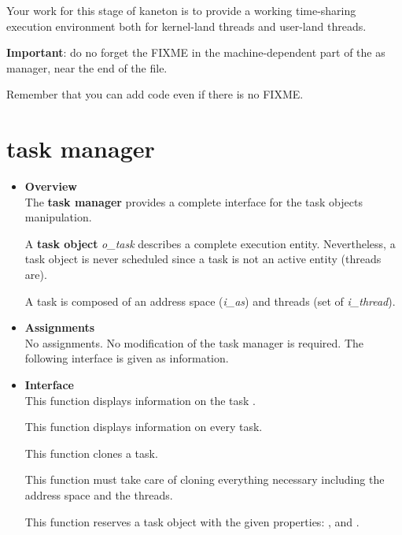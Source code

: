 Your work for this stage of kaneton is to provide a working
time-sharing execution environment both for kernel-land threads and
user-land threads.

\textbf{Important}: do no forget the FIXME in the machine-dependent
part of the as manager, near the end of the file.

Remember that you can add code even if there is no FIXME.


%
%

\newpage

\section{\textbf{task} manager}

\begin{itemize}
  \item {\bf Overview}\\

    The \textbf{task manager} provides a complete interface for the
    task objects manipulation.

    A \textbf{task object} \textit{o\_task} describes a complete
    execution entity. Nevertheless, a task object is never scheduled
    since a task is not an active entity (threads are).

    A task is composed of an address space (\textit{i\_as}) and threads
    (set of \textit{i\_thread}).

  \item {\bf Assignments}\\

    No assignments. No modification of the task manager is
    required. The following interface is given as information.

  \item {\bf Interface}\\

	 {
	   This function displays information on the task .
	 }

	 {
	   This function displays information on every task.
	 }

	 {
	   This function clones a task.

	   This function must take care of cloning everything necessary
	   including the address space and the threads.
	 }

	 {
	   This function reserves a task object with the given
	   properties: ,  and
	   .

}
\end{itemize}
